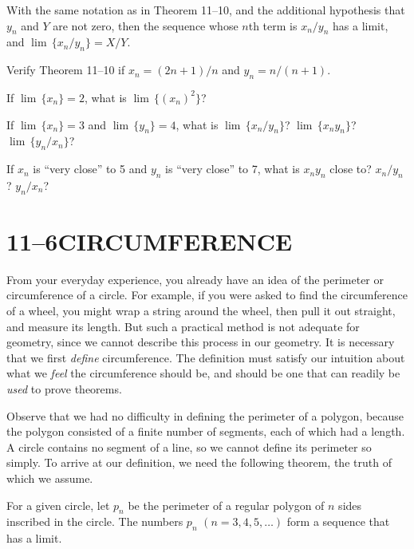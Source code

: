 \documentclass[11pt]{book}
\theoremstyle{XIplainnote}
\theoremstyle{bkplain}
\begin{document}
\begin{theorem}
With the same notation as in Theorem 11--10, and the additional hypothesis that
$y_n$ and $Y$ are not zero, then the sequence whose $n$th term is $x_n/y_n$ has
a limit, and $\lim\,\{x_n/y_n\} = X/Y$.
\end{theorem}

\begin{exercisecols}
\begin{exlist}
\item Verify Theorem 11--10 if $x_n = (2n + 1)/n$ and $y_n = n/(n + 1)$.
\item If $\lim\,\{x_n\} = 2$, what is $\lim\,\{(x_n)^2\}$?
\item If $\lim\,\{x_n\} = 3$ and $\lim\,\{y_n\} = 4$, what is
      $\lim\,\{x_n/y_n\}$? $\lim\,\{x_n y_n\}$? $\lim\,\{y_n/x_n\}$?
\item If $x_n$ is ``very close'' to 5 and $y_n$ is ``very close'' to 7, what is
      $x_n y_n$ close to? $x_n/y_n$? $y_n/x_n$?
\end{exlist}
\end{exercisecols}

\section*{11--6\quad CIRCUMFERENCE}

From your everyday experience, you already have an idea of the perimeter or
circumference of a circle. For example, if you were asked to find the
circumference of a wheel, you might wrap a string around the wheel, then pull
it out straight, and measure its length. But such a practical method is not
adequate for geometry, since we cannot describe this process in our geometry.
It is necessary that we first \emph{define} circumference. The definition must
satisfy our intuition about what we \emph{feel} the circumference should be,
and should be one that can readily be \emph{used} to prove theorems.

Observe that we had no difficulty in defining the perimeter of a polygon,
because the polygon consisted of a finite number of segments, each of which had
a length. A circle contains no segment of a line, so we cannot define its
perimeter so simply. To arrive at our definition, we need the following
theorem, the truth of which we assume.

\begin{theorem}
For a given circle, let $p_n$ be the perimeter of a regular polygon of $n$
sides inscribed in the circle. The numbers $p_n$ $(n = 3, 4, 5,\ldots)$ form a
sequence that has a limit.
\end{theorem}
\end{document}
